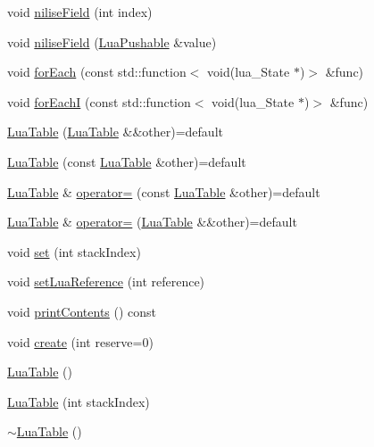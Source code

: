 \begin{DoxyCompactItemize}
void \hyperlink{classZeta_1_1LuaTable_a4bb98d474069e7d38ed9dfac07002bc1}{nilise\+Field} (int index)
\item 
void \hyperlink{classZeta_1_1LuaTable_a5caefcb14bbefe927f6893b59602d510}{nilise\+Field} (\hyperlink{classZeta_1_1LuaPushable}{Lua\+Pushable} \&value)
\item 
void \hyperlink{classZeta_1_1LuaTable_a47e2538869a20041a1474baa49976e4a}{for\+Each} (const std\+::function$<$ void(lua\+\_\+\+State $\ast$)$>$ \&func)
\item 
void \hyperlink{classZeta_1_1LuaTable_a68ee9bbc9f59ad6f3f422d36a96e32e2}{for\+Each\+I} (const std\+::function$<$ void(lua\+\_\+\+State $\ast$)$>$ \&func)
\item 
\hyperlink{classZeta_1_1LuaTable_a9e20341b47a2b724a14fa16def2ebdb0}{Lua\+Table} (\hyperlink{classZeta_1_1LuaTable}{Lua\+Table} \&\&other)=default
\item 
\hyperlink{classZeta_1_1LuaTable_acc5cbc6d660cbb5bff9fe81e338e8083}{Lua\+Table} (const \hyperlink{classZeta_1_1LuaTable}{Lua\+Table} \&other)=default
\item 
\hyperlink{classZeta_1_1LuaTable}{Lua\+Table} \& \hyperlink{classZeta_1_1LuaTable_ad9a4684480bc181eb3b47be62aa7c4bf}{operator=} (const \hyperlink{classZeta_1_1LuaTable}{Lua\+Table} \&other)=default
\item 
\hyperlink{classZeta_1_1LuaTable}{Lua\+Table} \& \hyperlink{classZeta_1_1LuaTable_a586c4fc36125a9426ba0e5bc7fa78a45}{operator=} (\hyperlink{classZeta_1_1LuaTable}{Lua\+Table} \&\&other)=default
\item 
void \hyperlink{classZeta_1_1LuaTable_aaef5554a255658a2fefa84610b240865}{set} (int stack\+Index)
\item 
void \hyperlink{classZeta_1_1LuaTable_a51832c582c39dc740c54f7aadfa510ac}{set\+Lua\+Reference} (int reference)
\item 
void \hyperlink{classZeta_1_1LuaTable_a0d661eec5da2ffa0eb2351279faaa71d}{print\+Contents} () const 
\item 
void \hyperlink{classZeta_1_1LuaTable_ac670a2371e5f57e5c80928117c7e44e0}{create} (int reserve=0)
\item 
\hyperlink{classZeta_1_1LuaTable_a64d45ec1a82a6883390c2bbc4afda739}{Lua\+Table} ()
\item 
\hyperlink{classZeta_1_1LuaTable_a9ce97f11e24e66624d435698ee5591a2}{Lua\+Table} (int stack\+Index)
\item 
\hyperlink{classZeta_1_1LuaTable_abba2b58c4f154ec6d29b11561dcdadf5}{$\sim$\+Lua\+Table} ()
\end{DoxyCompactItemize}
